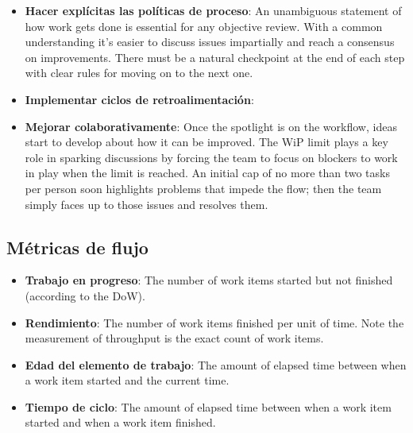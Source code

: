 \begin{itemize}
    \item \textbf{Hacer explícitas las políticas de proceso}: %
    An unambiguous statement
    of how work gets done is essential for any objective review.
    With a common understanding it's easier to discuss issues
    impartially and reach a consensus on improvements. There
    must be a natural checkpoint at the end of each step with
    clear rules for moving on to the next one.

    \item \textbf{Implementar ciclos de retroalimentación}: %

    \item \textbf{Mejorar colaborativamente}: %
    Once the spotlight is on the
    workflow, ideas start to develop about how it can be
    improved. The WiP limit plays a key role in sparking
    discussions by forcing the team to focus on blockers to work
    in play when the limit is reached. An initial cap of no more
    than two tasks per person soon highlights problems that
    impede the flow; then the team simply faces up to those
    issues and resolves them.
\end{itemize}

\subsection{Métricas de flujo}

\begin{itemize}
    \item \textbf{Trabajo en progreso}: The number of work items started but not finished
    (according to the DoW).
    \item \textbf{Rendimiento}: The number of work items finished per unit of
    time. Note the measurement of throughput is the exact count of work items.
    \item \textbf{Edad del elemento de trabajo}: The amount of elapsed time between when a work
    item started and the current time.
    \item \textbf{Tiempo de ciclo}: The amount of elapsed time between when a work
    item started and when a work item finished.
\end{itemize}

